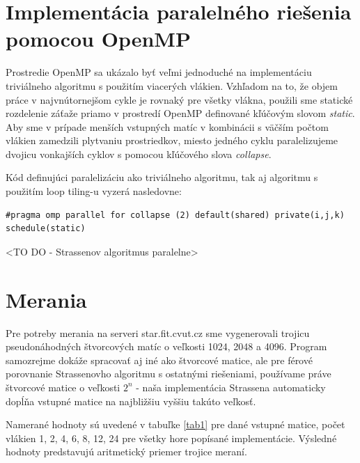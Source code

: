 \documentclass[slovak]{article}
\begin{document}
\section{Implementácia paralelného riešenia pomocou OpenMP}

Prostredie OpenMP sa ukázalo byť veľmi jednoduché na implementáciu triviálneho algoritmu s použitím viacerých vlákien. Vzhľadom na to, že objem práce v najvnútornejšom cykle je rovnaký pre všetky vlákna, použili sme statické rozdelenie záťaže priamo v prostredí OpenMP definované kľúčovým slovom \emph{static}. Aby sme v prípade menších vstupných matíc v kombinácii s väčším počtom vlákien zamedzili plytvaniu prostriedkov, miesto jedného cyklu paralelizujeme dvojicu vonkajších cyklov s pomocou kľúčového slova \emph{collapse}.

Kód definujúci paralelizáciu ako triviálneho algoritmu, tak aj algoritmu s použitím loop tiling-u vyzerá nasledovne:

\begin{verbatim}
#pragma omp parallel for collapse (2) default(shared) private(i,j,k)
schedule(static)
\end{verbatim}

<TO DO - Strassenov algoritmus paralelne>

\section{Merania}

Pre potreby merania na serveri star.fit.cvut.cz sme vygenerovali trojicu pseudonáhodných štvorcových matíc o veľkosti 1024, 2048 a 4096. Program samozrejme dokáže spracovať aj iné ako štvorcové matice, ale pre férové porovnanie Strassenovho algoritmu s ostatnými riešeniami, používame práve štvorcové matice o veľkosti  $2^n$ - naša implementácia Strassena automaticky dopĺňa vstupné matice na najbližšiu vyššiu takúto veľkosť.

Namerané hodnoty sú uvedené v tabuľke \ref{tab1} pre dané vstupné matice, počet vlákien 1, 2, 4, 6, 8, 12, 24 pre všetky hore popísané implementácie. Výsledné hodnoty predstavujú aritmetický priemer trojice meraní.
\end{document}
